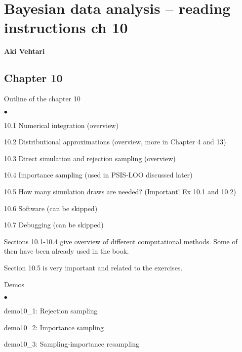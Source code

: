 \documentclass[a4paper,11pt,english]{article}
\begin{document}
\thispagestyle{empty}

\section*{Bayesian data analysis -- reading instructions ch 10} 
\smallskip
{\bf Aki Vehtari}
\smallskip

\subsection*{Chapter 10}

Outline of the chapter 10
\begin{list}{$\bullet$}{\parsep=0pt\itemsep=2pt}
\item 10.1 Numerical integration (overview)
\item 10.2 Distributional approximations (overview, more in Chapter 4 and 13)
\item 10.3 Direct simulation and rejection sampling (overview)
\item 10.4 Importance sampling (used in PSIS-LOO discussed later)
\item 10.5 How many simulation draws are needed? (Important! Ex 10.1 and 10.2)
\item 10.6 Software (can be skipped)
\item 10.7 Debugging (can be skipped)
\end{list}

Sections 10.1-10.4 give overview of different computational
methods. Some of then have been already used in the book.

Section 10.5 is very important and related to the exercises.

Demos
\begin{list}{$\bullet$}{\parsep=0pt\itemsep=2pt}
\item demo10\_1: Rejection sampling
\item demo10\_2: Importance sampling
\item demo10\_3: Sampling-importance resampling
\end{list}
\end{document}
